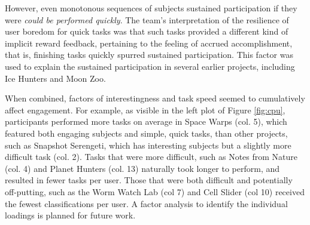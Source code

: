 \documentclass{sigchi}
\begin{document}


However, even monotonous sequences of subjects sustained participation if they were \emph{could be performed quickly}. The team's interpretation of the resilience of user boredom for quick tasks was that such tasks provided a different kind of implicit reward feedback, pertaining to the feeling of accrued accomplishment, that is, finishing tasks quickly spurred sustained participation.  This factor was used to explain the sustained participation in several earlier projects, including Ice Hunters and Moon Zoo.

When combined, factors of interestingness and task speed seemed to cumulatively affect engagement. For example, as visible in the left plot of Figure \ref{fig:cpu}, participants performed more tasks on average in Space Warps (col. 5), which featured both engaging subjects and simple, quick tasks, than other projects, such as Snapshot Serengeti, which has interesting subjects but a slightly more difficult task (col. 2). Tasks that were more difficult, such as Notes from Nature (col. 4) and Planet Hunters (col. 13) naturally took longer to perform, and resulted in fewer tasks per user.  Those that were both difficult and potentially off-putting, such as the Worm Watch Lab (col 7) and Cell Slider (col 10) received the fewest classifications per user.  A factor analysis to identify the individual loadings is planned for future work.  




\end{document}
